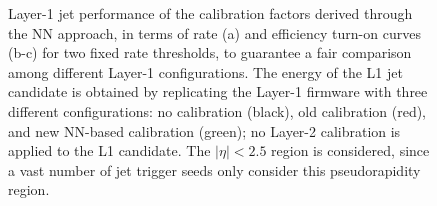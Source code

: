\begin{figure}
    \centering
    
    \caption{Layer-1 jet performance of the calibration factors derived through the NN approach, in terms of rate (a) and efficiency turn-on curves (b-c) for two fixed rate thresholds, to guarantee a fair comparison among different Layer-1 configurations. The energy of the L1 jet candidate is obtained by replicating the Layer-1 firmware with three different configurations: no calibration (black), old calibration (red), and new NN-based calibration (green); no Layer-2 calibration is applied to the L1 candidate. The $|\eta|<2.5$ region is considered, since a vast number of jet trigger seeds only consider this pseudorapidity region.}
    \label{fig:NN_HCAL_TurnOn_ER2p5}
\end{figure}

